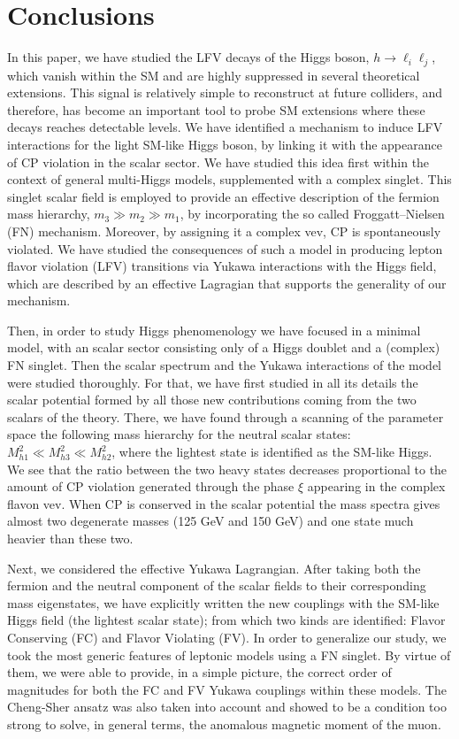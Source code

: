 \documentclass[aps,prd,groupaddress,floatfix,tighten,nofootinbib,showpacs,
amsfonts,superscriptaddress]{revtex4}
\begin{document}
{%
\section{Conclusions\label{Sec:Conclusions}}
In this paper, we have studied the LFV decays of the Higgs boson,  $h\to \ell_i \ell_j$, 
which vanish within the SM and are highly suppressed in several theoretical extensions.  This signal
is relatively simple to reconstruct at future colliders, and therefore, has become an important tool to probe 
SM extensions where these decays reaches detectable levels. We have identified a mechanism to induce LFV interactions
for the light SM-like Higgs boson,  by linking it with the appearance of CP violation in the scalar sector.
We have studied this idea first within the context of general multi-Higgs models, supplemented with a complex 
singlet.
This singlet scalar field is employed to provide an effective description of the fermion mass hierarchy, 
$m_3 \gg m_2 \gg m_1$, by incorporating the so called Froggatt--Nielsen (FN) mechanism. Moreover, 
by assigning it a complex vev, CP is spontaneously violated.
We have studied the consequences of such a model in producing lepton flavor violation 
(LFV) transitions via Yukawa interactions with the Higgs field, which are described by
an effective Lagragian that supports the generality of our mechanism. 

Then, in order to study Higgs phenomenology
we have focused in a minimal model, with an scalar sector  
consisting only of a Higgs doublet and a (complex) FN singlet. 
Then the scalar spectrum and the Yukawa interactions of the model were studied thoroughly. 
For that, we have first studied in all its details the 
scalar potential formed by all those new contributions coming from the two scalars of the theory. 
There, we have found through a scanning of the parameter space the following mass hierarchy for the neutral scalar states:
$M_{h1}^2 \ll M_{h3}^2 \ll M_{h2}^2$, where the lightest state is identified as the SM-like Higgs. 
We see that the ratio between the two heavy states decreases proportional to the amount of CP violation 
generated through the phase $\xi$ appearing in the complex flavon vev. When CP is conserved in the scalar 
potential the mass spectra gives almost two degenerate masses (125 GeV and 150 GeV) and one state much heavier 
than these two. 

Next, we considered the effective Yukawa Lagrangian. After taking both the fermion and the neutral 
component of the scalar fields to their corresponding mass eigenstates, we have
explicitly written the new couplings with the SM-like Higgs field (the lightest scalar state);
from which two kinds are identified: Flavor Conserving (FC) and Flavor Violating (FV). 
In order to generalize our study, we took the most generic features of leptonic models using a FN singlet. By virtue of them, we were able to provide, in a simple picture, the correct order of magnitudes for both the FC and FV Yukawa couplings within these models. The Cheng-Sher ansatz was also taken into account and showed to be a condition too strong to solve, in general terms, the anomalous magnetic moment of the muon.

}
\end{document}
